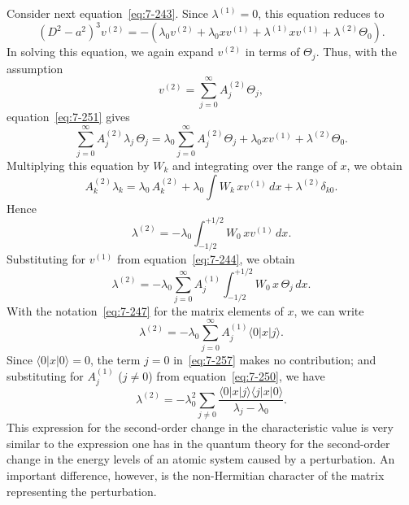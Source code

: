 Consider next equation~\eqref{eq:7-243}.  Since $\lambda^{(1)} = 0$, this equation reduces to
\begin{equation}
\label{eq:7-251}
(D^2-a^2)^3 v^{(2)} = -(\lambda_0 v^{(2)}
+ \lambda_0 xv^{(1)} + \lambda^{(1)}xv^{(1)} + \lambda^{(2)}\Theta_0).
\end{equation}
In solving this equation, we again expand $v^{(2)}$ in terms of $\Theta_j$.  Thus, with
the assumption
\begin{equation}
\label{eq:7-252}
v^{(2)} = \sum_{j=0}^{\infty} A_j^{(2)}\Theta_j,
\end{equation}
equation~\eqref{eq:7-251} gives
\begin{equation}
\label{eq:7-253}
\sum_{j=0}^{\infty} A_j^{(2)}\lambda_j\,\Theta_j
= \lambda_0\sum_{j=0}^{\infty} A_j^{(2)}\Theta_j
+ \lambda_0 xv^{(1)} + \lambda^{(2)}\Theta_0.
\end{equation}
Multiplying this equation by $W_k$ and integrating over the range of $x$, we
obtain
\begin{equation}
\label{eq:7-254}
A_k^{(2)}\lambda_k = \lambda_0\, A_k^{(2)}
+ \lambda_0 \int W_k\, xv^{(1)}\, dx + \lambda^{(2)}\delta_{k0}.
\end{equation}
Hence
\begin{equation}
\label{eq:7-255}
\lambda^{(2)} = -\lambda_0 \int_{-1/2}^{+1/2} W_0\, xv^{(1)}\, dx.
\end{equation}
Substituting for $v^{(1)}$ from equation~\eqref{eq:7-244}, we obtain
\begin{equation}
\label{eq:7-256}
\lambda^{(2)} = -\lambda_0 \sum_{j=0}^{\infty} A_j^{(1)}
\int_{-1/2}^{+1/2} W_0\, x\,\Theta_j\, dx.
\end{equation}
With the notation~\eqref{eq:7-247} for the matrix elements of $x$, we can write
\begin{equation}
\label{eq:7-257}
\lambda^{(2)} = -\lambda_0 \sum_{j=0}^{\infty} A_j^{(1)}\langle 0|x|j\rangle.
\end{equation}
Since $\langle 0|x|0\rangle = 0$, the term $j = 0$ in~\eqref{eq:7-257} makes no contribution; and
substituting for $A_j^{(1)}$ ($j \neq 0$) from equation~\eqref{eq:7-250}, we have
\begin{equation}
\label{eq:7-258}
\lambda^{(2)} = -\lambda_0^2\sum_{j \neq 0}
\frac{\langle 0|x|j\rangle\langle j|x|0\rangle}{\lambda_j-\lambda_0}.
\end{equation}
This expression for the second-order change in the characteristic
value is very similar to the expression one has in the quantum theory for the
second-order change in the energy levels of an atomic system caused by
a perturbation.  An important difference, however, is the non-Hermitian
character of the matrix representing the perturbation.

